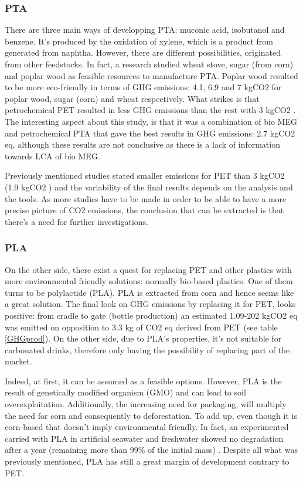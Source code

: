 \documentclass[twoside,a4paper,12pt]{report}
\begin{document}
\subsubsection{PTA}
There are three main ways of developping PTA: muconic acid, isobutanol and benzene. It's produced by the oxidation of xylene, which is a product from generated from naphtha. However, there are different possibilities, originated from other feedstocks. In fact, a research studied wheat stove, sugar (from corn) and poplar wood as feasible resources to manufacture PTA. Poplar wood resulted to be more eco-friendly in terms of GHG emissions: 4.1, 6.9 and 7 kgCO2 for poplar wood, sugar (corn) and wheat respectively. What strikes is that petrochemical PET  resulted in less GHG emissions than the rest with 3 kgCO2 \cite{Akanuma2014}. The interesting aspect about this study, is that it was a combination of bio MEG and petrochemical PTA that gave the best results in  GHG emissions: 2.7 kgCO2 eq, although these results are not conclusive as there is a lack of information towards LCA of bio MEG.

Previously mentioned studies stated smaller emissions for PET than 3 kgCO2 (1.9 kgCO2 \cite{PEPETecoprofile}) and the variability of the final results depends on the analysis and the tools. As more studies have to be made in order to be able to have a more precise picture of CO2 emissions, the conclusion that can be extracted is that there's a need for further investigations. 


\subsubsection{PLA}

On the other side, there exist a quest for replacing PET and other plastics with more environmental friendly solutions: normally bio-based plastics. One of them turns to be polylactide (PLA). PLA is extracted from corn and hence seems like a great solution. The final look on GHG emissions by replacing it for PET, looks positive: from cradle to gate (bottle production) an estimated 1.09-202 kgCO2 eq was emitted \cite{mlade2016corn} on opposition to 3.3 kg of CO2 eq derived from PET (see table \ref{GHGprod}). On the other side,  due to PLA's properties, it's not suitable for carbonated drinks, therefore only having the possibility of replacing part of the market.

Indeed, at first, it can be assumed as a feasible options. However, PLA is the result of genetically modified organism (GMO) and can lead to soil overexploitation. Additionally, the increasing need for packaging, will multiply the need for corn and consequently to deforestation. To add up, even though it is corn-based that doesn't imply environmental friendly. In fact, an experimented carried with PLA in artificial seawater and freshwater showed no degradation after a year (remaining more than 99\% of the initial mass) \cite{Bagheri2017}. Despite all what was previously mentioned, PLA has still a great margin of development contrary to PET.
\end{document}
